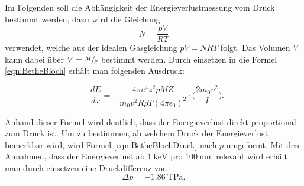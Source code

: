 Im Folgenden soll die Abhängigkeit der Energieverlustmessung vom Druck bestimmt werden, dazu
wird die Gleichung
\begin{equation}
N=\frac{pV}{RT}
\end{equation}
verwendet, welche aus der idealen Gasgleichung $pV=NRT$ folgt. Das Volumen $V$ kann
dabei über $V=\sfrac{M}{\rho}$ bestimmt werden. Durch einsetzen in die Formel \ref{eqn:BetheBloch}
erhält man folgenden Ausdruck:

\begin{equation}
  -\frac{dE}{dx}=-\frac{4\pi e^4 z^2 p MZ}{m_0 v^2 R\rho T (4\pi\epsilon_0)^2}\cdot\Big(\frac{2m_0v^2}{I}).
  \label{eqn:BetheBlochDruck}
\end{equation}

Anhand dieser Formel wird deutlich, dass der Energieverlust direkt proportional zum
Druck ist. Um zu bestimmen, ab welchem Druck der Energieverlust bemerkbar wird, wird
Formel \ref{eqn:BetheBlochDruck} nach $p$ umgeformt. Mit den Annahmen, dass der Energieverlust
ab $\SI{1}{\kilo\eV}$ pro $\SI{100}{\mm}$ relevant wird erhält man durch einsetzen eine
Druckdifferenz von
\begin{equation}
  \Delta p=\SI{-1,86}{\tera\Pa}.
\end{equation}
